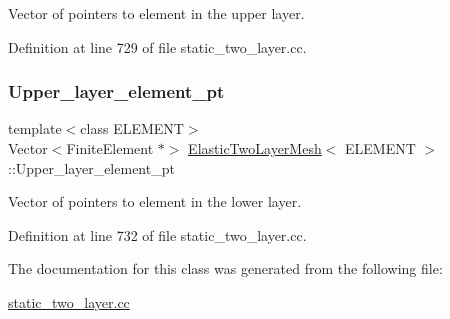 Vector of pointers to element in the upper layer. 



Definition at line 729 of file static\+\_\+two\+\_\+layer.\+cc.

\mbox{\label{classElasticTwoLayerMesh_ae46d4ef2bb95a6c023bd0dc1e367ccfb}} 
\subsubsection{\texorpdfstring{Upper\+\_\+layer\+\_\+element\+\_\+pt}{Upper\_layer\_element\_pt}}
{\footnotesize\ttfamily template$<$class E\+L\+E\+M\+E\+NT$>$ \\
Vector$<$Finite\+Element $\ast$$>$ \hyperlink{classElasticTwoLayerMesh}{Elastic\+Two\+Layer\+Mesh}$<$ E\+L\+E\+M\+E\+NT $>$\+::Upper\+\_\+layer\+\_\+element\+\_\+pt\hspace{0.3cm}{\ttfamily [private]}}



Vector of pointers to element in the lower layer. 



Definition at line 732 of file static\+\_\+two\+\_\+layer.\+cc.



The documentation for this class was generated from the following file\+:\begin{DoxyCompactItemize}
\item 
\hyperlink{static__two__layer_8cc}{static\+\_\+two\+\_\+layer.\+cc}\end{DoxyCompactItemize}
